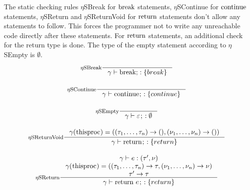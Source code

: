 \documentclass[a4paper, 10pt, draft]{report}
\newcommand{\mycode}[1]{\ensuremath{\mbox{\lstinline{#1}}}}
\begin{document}
The static checking rules $\eta$SBreak for \mycode{break} statements,
$\eta$SContinue for \mycode{continue} statements, $\eta$SReturn and
$\eta$SReturnVoid for \mycode{return} statements don't allow any statements to
follow. This forces the programmer not to write any unreachable code directly
after these statements. For \mycode{return} statements, an additional check for
the return type is done. The type of the empty statement according to
$\eta$SEmpty is $\emptyset$.
\[ \begin{array}{c}
\inference[$\eta$SBreak]{}{\gamma |- \mycode{break;} : \left\{ break \right\} } \\[2em]
\inference[$\eta$SContinue]{}{\gamma |- \mycode{continue;} : \left\{ continue\right\} } \\[2em]
\inference[$\eta$SEmpty]{}{\gamma |- \varepsilon\mycode{;} : \emptyset } \\[2em]
\inference[$\eta$SReturnVoid]{
  \gamma(\mycode{thisproc}) = ( (\tau_1,\ldots,\tau_n)\to(),(\nu_1,\ldots,\nu_n)\to())
}{
  \gamma |- \mycode{return;} : \left\{ return \right\}
} \\[2em]
\inference[$\eta$SReturn]{
  \gamma |- e : \left( \tau', \nu \right)  \\
  \gamma(\mycode{thisproc}) = ( (\tau_1,\ldots,\tau_n)\to\tau,(\nu_1,\ldots,\nu_n)\to\nu) \\
  \tau' \to \tau
}{
  \gamma |- \mycode{return}\ e \mycode{;} : \left\{ return \right\}
}
\end{array}\]
\end{document}

